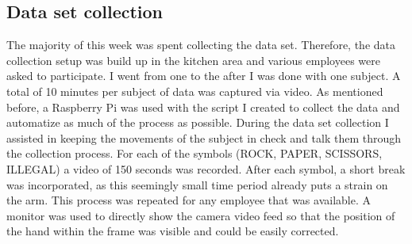 \subsection{Data set collection}
The majority of this week was spent collecting the data set. Therefore, the data collection setup was build up in the kitchen area and various employees were asked to participate. I went from one to the after I was done with one subject. A total of 10 minutes per subject of data was captured via video. As mentioned before, a Raspberry Pi was used with the script I created to collect the data and automatize as much of the process as possible. During the data set collection I assisted in keeping the movements of the subject in check and talk them through the collection process. For each of the symbols (ROCK, PAPER, SCISSORS, ILLEGAL) a video of 150 seconds was recorded. After each symbol, a short break was incorporated, as this seemingly small time period already puts a strain on the arm. This process was repeated for any employee that was available. A monitor was used to directly show the camera video feed so that the position of the hand within the frame was visible and could be easily corrected.
